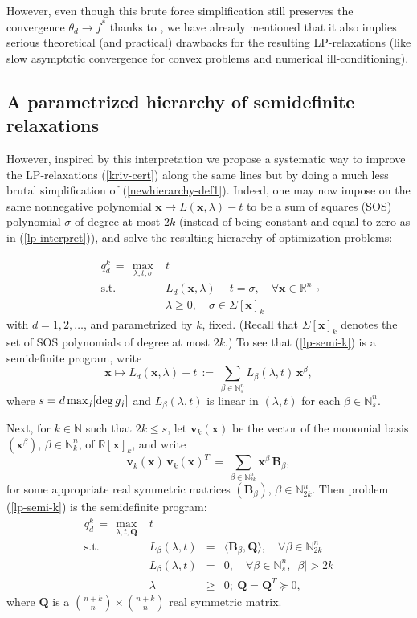 \documentclass[11pt]{article}
\numberwithin{equation}{section}
\def\x{\mathbf{x}}
\def\R{\mathbb{R}}
\def\N{\mathbb{N}}
\def\Q{\mathbf{Q}}
\def\B{\mathbf{B}}
\def\v{\mathbf{v}}
\begin{document}
However, even though this brute force simplification
still preserves the convergence $\theta_d\to f^*$ thanks to \cite[Theorem 2.23]{lasserre-imperial}, we have already mentioned that it also implies serious theoretical (and practical) drawbacks for
the resulting LP-relaxations (like slow asymptotic convergence for convex problems and numerical ill-conditioning).

\subsection{A parametrized hierarchy of semidefinite relaxations} However, inspired by this interpretation
we propose a systematic way to improve the LP-relaxations (\ref{kriv-cert}) along the same lines
but by doing a much less brutal simplification of (\ref{newhierarchy-def1}). Indeed,
one may now impose on the same
nonnegative polynomial $\x\mapsto L(\x,\lambda)-t$ to be a
sum of squares (SOS) polynomial $\sigma$ of degree at most $2k$ (instead of being
constant and equal to zero as in (\ref{lp-interpret})), and solve the resulting hierarchy of optimization problems:

\begin{equation}
\label{lp-semi-k}
\begin{array}{rl}
q^k_d\,=\,\displaystyle\max_{\lambda,t,\sigma}&t\\
\mbox{s.t.}&L_d(\x,\lambda)-t=\sigma,\quad \forall \x\in\R^n\\
&\lambda\geq0,\quad\sigma\in\Sigma[\x]_k\end{array},
\end{equation}
with $d=1,2,\ldots$, and parametrized by $k$, fixed.
(Recall that  $\Sigma[\x]_k$ denotes the set of SOS polynomials of degree at most $2k$.) To see that (\ref{lp-semi-k}) is a semidefinite program, write
\[\x\mapsto L_d(\x,\lambda)-t\,:=\,\sum_{\beta\in\N^n_s}L_\beta(\lambda,t)\,\x^\beta,\]
where $s=d\max_j[{\rm deg}\,g_j]$ and $L_\beta(\lambda,t)$ is linear in $(\lambda,t)$ for each $\beta\in\N^n_s$.

Next, for $k\in\N$ such that $2k\leq s$, let $\v_k(\x)$ be the vector of the monomial basis $(\x^\beta)$, $\beta\in\N^n_k$, of $\R[\x]_k$, and write
\[\v_k(\x)\,\v_k(\x)^T\,=\,\sum_{\beta\in\N^n_{2k}}\x^\beta\,\B_\beta,\]
for some appropriate real symmetric matrices $(\B_\beta)$, $\beta\in\N^n_{2k}$. 
Then problem (\ref{lp-semi-k}) is the semidefinite program:
\begin{equation}
\label{sdp-k}
\begin{array}{rcll}
q^k_d\,=\,\displaystyle\max_{\lambda,t,\Q}&t&&\\
\mbox{s.t.}&L_\beta(\lambda,t)&=&\langle \B_\beta,\Q\rangle,\quad \forall \beta\in\N^n_{2k}\\
&L_\beta(\lambda,t)&=&0,\quad\forall \beta\in\N^n_s,\:\vert\beta\vert>2k\\
&\lambda&\geq&0;\:\Q=\Q^T\succeq0,
\end{array}\end{equation}
where $\Q$ is a ${n+k\choose n}\times {n+k\choose n}$ real symmetric matrix.
\end{document}
